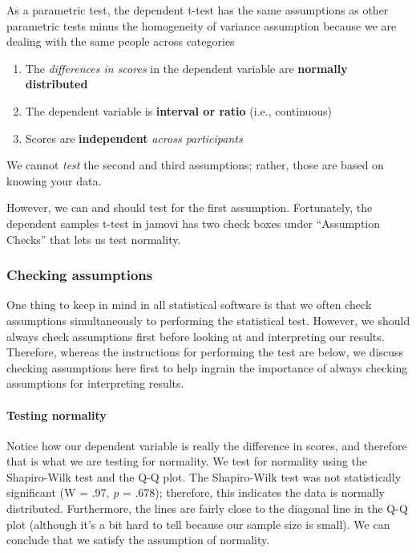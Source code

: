 \documentclass[
]{book}
\begin{document}
As a parametric test, the dependent t-test has the same assumptions as other parametric tests minus the homogeneity of variance assumption because we are dealing with the same people across categories

\begin{enumerate}
\def\labelenumi{\arabic{enumi}.}
\item
  The \emph{differences in scores} in the dependent variable are \textbf{normally distributed}
\item
  The dependent variable is \textbf{interval or ratio} (i.e., continuous)
\item
  Scores are \textbf{independent} \emph{across participants}
\end{enumerate}

We cannot \emph{test} the second and third assumptions; rather, those are based on knowing your data.

However, we can and should test for the first assumption. Fortunately, the dependent samples t-test in jamovi has two check boxes under ``Assumption Checks'' that lets us test normality.

\hypertarget{checking-assumptions-3}{%
\subsubsection{Checking assumptions}\label{checking-assumptions-3}}

One thing to keep in mind in all statistical software is that we often check assumptions simultaneously to performing the statistical test. However, we should always check assumptions first before looking at and interpreting our results. Therefore, whereas the instructions for performing the test are below, we discuss checking assumptions here first to help ingrain the importance of always checking assumptions for interpreting results.

\hypertarget{testing-normality-2}{%
\paragraph{Testing normality}\label{testing-normality-2}}

Notice how our dependent variable is really the difference in scores, and therefore that is what we are testing for normality. We test for normality using the Shapiro-Wilk test and the Q-Q plot. The Shapiro-Wilk test was not statistically significant (W = .97, \emph{p} = .678); therefore, this indicates the data is normally distributed. Furthermore, the lines are fairly close to the diagonal line in the Q-Q plot (although it's a bit hard to tell because our sample size is small). We can conclude that we satisfy the assumption of normality.
\end{document}
